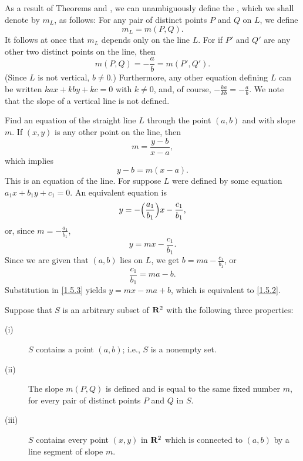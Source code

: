 
As a result of Theorems  and ,
we can unambiguously define the ,
which we shall denote by $m_{L}$,
as follows:
For any pair of distinct points $P$ and $Q$ on $L$, we define
\[
  m_{L} = m(P, Q).
\]
It follows at once that $m_{L}$ depends only on the line $L$.
For if $P'$ and $Q'$ are any other two distinct points on the line, then
\[
m(P, Q) = - \frac{a}{b} = m(P', Q').
\]
(Since $L$ is not vertical, $b \neq 0$.) Furthermore, any other equation defining $L$ can be written $kax + kby + kc = 0$ with $k \neq 0$, and, of course, $-\frac{ka}{kb} = -\frac{a}{b}$.
We note that the slope of a vertical line is not defined.

\begin{example}
\label{exam 1.5.1}
Find an equation of the straight line $L$ through the point $(a, b)$ and with slope $m$.
If $(x, y)$ is any other point on the line, then
\[
m = \frac{y - b}{x - a},
\]
which implies
\begin{equation}
 y - b = m(x - a).
\label{eq1.5.2}
\end{equation}
This is an equation of the line.
For suppose $L$ were defined by some equation $a_{1}x + b_{1}y + c_1 = 0$.
An equivalent equation is
\[
y = -\Bigl( \frac {a_1}{b_1} \Bigr) x -\frac{c_1}{b_1},
\]
or, since $m = -\frac{a_1}{b_1}$,
\begin{equation}
y = mx - \frac{c_1}{b_1}.
\label{eq1.5.3}
\end{equation}
Since we are given that $(a, b)$ lies on $L$, we get $b = ma - \frac{c_1}{b_1}$, or
\[
\frac{c_1}{b_1} = ma - b.
\]
Substitution in \eqref{1.5.3} yields $y = mx - ma + b$,
which is equivalent to \eqref{1.5.2}.
\end{example}

Suppose that $S$ is an arbitrary subset of $\mathrm{\bf R}^2$ with the following three properties:


\begin{description}
\item[(i)] $S$ contains a point $(a, b)$; i.e., $S$ is a nonempty set.
\item[(ii)] The slope $m(P, Q)$ is defined and is equal to the same fixed number $m$, for every pair of distinct points $P$ and $Q$ in $S$.
\item[(iii)] $S$ contains every point  $(x, y)$ in $\mathrm{\bf R}^2$  which is connected to $(a, b)$ by a line segment of slope $m$.
\end{description}

